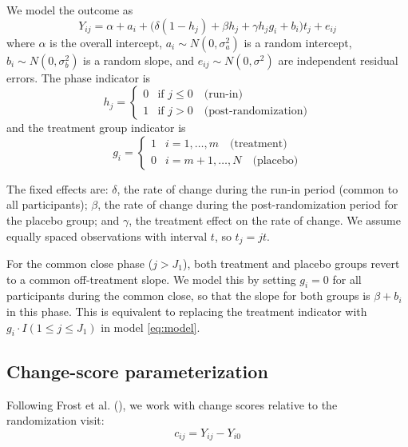\documentclass[
  11pt,
]{article}
\begin{document}
We model the outcome as \begin{equation}
  Y_{ij} = \alpha + a_i +
  \bigl(\delta(1-h_j) + \beta h_j + \gamma h_j g_i + b_i
  \bigr) t_j + e_{ij}
  \label{eq:model}
\end{equation} where \(\alpha\) is the overall intercept,
\(a_i \sim N(0,
\sigma_a^2)\) is a random intercept, \(b_i \sim N(0,
\sigma_b^2)\) is a random slope, and \(e_{ij} \sim N(0,
\sigma^2)\) are independent residual errors. The phase indicator is \[
  h_j =
  \begin{cases}
    0 & \text{if } j \le 0 \quad \text{(run-in)} \\
    1 & \text{if } j > 0 \quad \text{(post-randomization)}
  \end{cases}
\] and the treatment group indicator is \[
  g_i =
  \begin{cases}
    1 & i = 1, \ldots, m
      \quad \text{(treatment)} \\
    0 & i = m+1, \ldots, N
      \quad \text{(placebo)}
  \end{cases}
\]

The fixed effects are: \(\delta\), the rate of change during the run-in
period (common to all participants); \(\beta\), the rate of change
during the post-randomization period for the placebo group; and
\(\gamma\), the treatment effect on the rate of change. We assume
equally spaced observations with interval \(t\), so \(t_j = jt\).

For the common close phase (\(j > J_1\)), both treatment and placebo
groups revert to a common off-treatment slope. We model this by setting
\(g_i = 0\) for all participants during the common close, so that the
slope for both groups is \(\beta
+ b_i\) in this phase. This is equivalent to replacing the treatment
indicator with \(g_i \cdot I(1 \le j \le J_1)\) in model
\eqref{eq:model}.

\subsection{Change-score
parameterization}\label{change-score-parameterization}

Following Frost et al.
(), we work with
change scores relative to the randomization visit: \begin{equation}
  c_{ij} = Y_{ij} - Y_{i0}
  \label{eq:change}
\end{equation}
\end{document}
